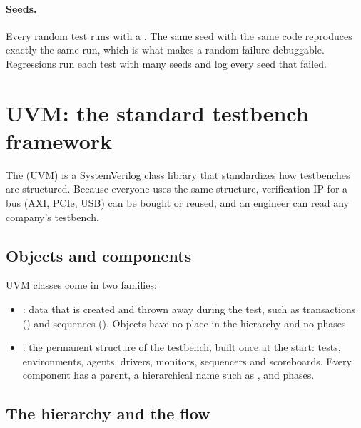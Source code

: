 \paragraph{Seeds.} Every random test runs with a . The same seed with the same code reproduces exactly the same run, which is what makes a random failure debuggable. Regressions run each test with many seeds and log every seed that failed.

\section{UVM: the standard testbench framework}

The  (UVM) is a SystemVerilog class library that standardizes how testbenches are structured. Because everyone uses the same structure, verification IP for a bus (AXI, PCIe, USB) can be bought or reused, and an engineer can read any company's testbench.

\subsection*{Objects and components}

UVM classes come in two families:
\begin{itemize}
  \item {}: data that is created and thrown away during the test, such as transactions () and sequences (). Objects have no place in the hierarchy and no phases.
  \item {}: the permanent structure of the testbench, built once at the start: tests, environments, agents, drivers, monitors, sequencers and scoreboards. Every component has a parent, a hierarchical name such as , and phases.
\end{itemize}

\subsection*{The hierarchy and the flow}

